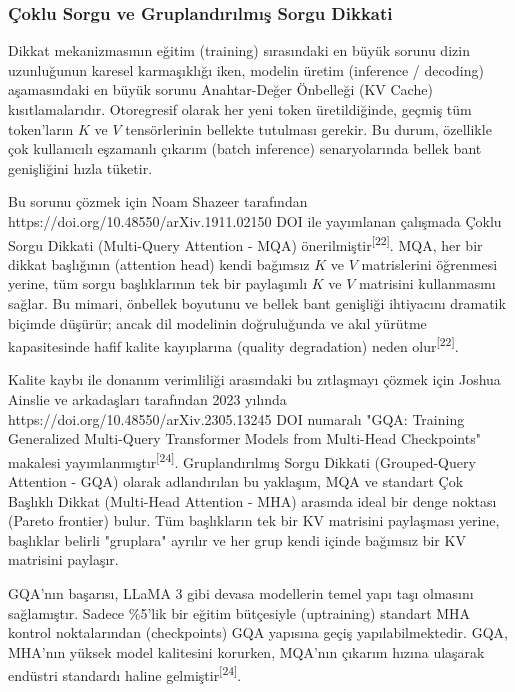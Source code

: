 \documentclass[11pt,a4paper]{article}
\begin{document}
\subsubsection{Çoklu Sorgu ve Gruplandırılmış Sorgu Dikkati}
Dikkat mekanizmasının eğitim (training) sırasındaki en büyük sorunu dizin uzunluğunun karesel karmaşıklığı iken, modelin üretim (inference / decoding) aşamasındaki en büyük sorunu Anahtar-Değer Önbelleği (KV Cache) kısıtlamalarıdır. Otoregresif olarak her yeni token üretildiğinde, geçmiş tüm token'ların \(K\) ve \(V\) tensörlerinin bellekte tutulması gerekir. Bu durum, özellikle çok kullanıcılı eşzamanlı çıkarım (batch inference) senaryolarında bellek bant genişliğini hızla tüketir.

Bu sorunu çözmek için Noam Shazeer tarafından https://doi.org/10.48550/arXiv.1911.02150 DOI ile yayımlanan çalışmada Çoklu Sorgu Dikkati (Multi-Query Attention - MQA) önerilmiştir\textsuperscript{[22]}. MQA, her bir dikkat başlığının (attention head) kendi bağımsız \(K\) ve \(V\) matrislerini öğrenmesi yerine, tüm sorgu başlıklarının tek bir paylaşımlı \(K\) ve \(V\) matrisini kullanmasını sağlar. Bu mimari, önbellek boyutunu ve bellek bant genişliği ihtiyacını dramatik biçimde düşürür; ancak dil modelinin doğruluğunda ve akıl yürütme kapasitesinde hafif kalite kayıplarına (quality degradation) neden olur\textsuperscript{[22]}.

Kalite kaybı ile donanım verimliliği arasındaki bu zıtlaşmayı çözmek için Joshua Ainslie ve arkadaşları tarafından 2023 yılında https://doi.org/10.48550/arXiv.2305.13245 DOI numaralı "GQA: Training Generalized Multi-Query Transformer Models from Multi-Head Checkpoints" makalesi yayımlanmıştır\textsuperscript{[24]}. Gruplandırılmış Sorgu Dikkati (Grouped-Query Attention - GQA) olarak adlandırılan bu yaklaşım, MQA ve standart Çok Başlıklı Dikkat (Multi-Head Attention - MHA) arasında ideal bir denge noktası (Pareto frontier) bulur. Tüm başlıkların tek bir KV matrisini paylaşması yerine, başlıklar belirli "gruplara" ayrılır ve her grup kendi içinde bağımsız bir KV matrisini paylaşır.

GQA'nın başarısı, LLaMA 3 gibi devasa modellerin temel yapı taşı olmasını sağlamıştır. Sadece \%5'lik bir eğitim bütçesiyle (uptraining) standart MHA kontrol noktalarından (checkpoints) GQA yapısına geçiş yapılabilmektedir. GQA, MHA'nın yüksek model kalitesini korurken, MQA'nın çıkarım hızına ulaşarak endüstri standardı haline gelmiştir\textsuperscript{[24]}.
\end{document}
